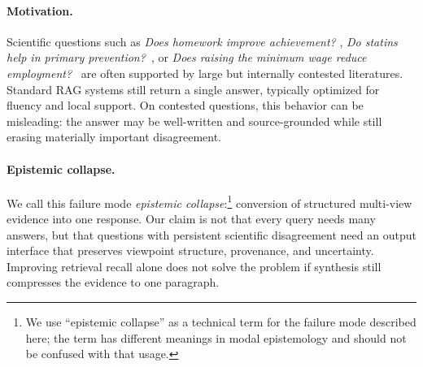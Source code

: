 \documentclass[11pt]{article}
\begin{document}
\paragraph{Motivation.}
Scientific questions such as \textit{Does homework improve achievement?}
\citep{cooper2006homework,scheb2023hurt},
\textit{Do statins help in primary prevention?}~\citep{ridker2008jupiter}, or
\textit{Does raising the minimum wage reduce employment?}~\citep{card1994minimum}
are often supported by large but internally contested literatures.  Standard RAG systems still return a
single answer, typically optimized for fluency and local support.  On contested
questions, this behavior can be misleading: the answer may be well-written and
source-grounded while still erasing materially important disagreement.

\paragraph{Epistemic collapse.}
We call this failure mode \emph{epistemic collapse}:\footnote{We use ``epistemic collapse'' as a technical term for the failure mode described here; the term has different meanings in modal epistemology and should not be confused with that usage.} conversion of structured
multi-view evidence into one response.  Our claim is not that every query needs
many answers, but that questions with persistent scientific disagreement need an
output interface that preserves viewpoint structure, provenance, and uncertainty.
Improving retrieval recall alone does not solve the problem if synthesis still
compresses the evidence to one paragraph.
\end{document}
